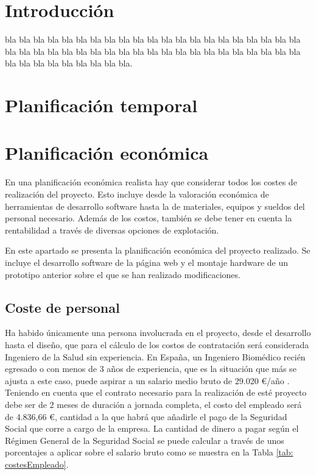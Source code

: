 
\section{Introducción}

bla bla bla bla bla bla bla bla bla bla bla bla bla bla bla bla bla bla bla bla bla bla bla bla bla bla bla bla bla bla bla bla bla bla bla bla bla bla bla bla bla bla bla bla bla bla bla bla bla bla bla.


\section{Planificación temporal}


\section{Planificación económica}
En una planificación económica realista hay que considerar todos los costes de realización del proyecto. Esto incluye desde la valoración económica de herramientas de desarrollo software hasta la de materiales, equipos y sueldos del personal necesario.
Además de los costos, también se debe tener en cuenta la rentabilidad a través de diversas opciones de explotación.

En este apartado se presenta la planificación económica del proyecto realizado. Se incluye el desarrollo software de la página web y el montaje hardware de un prototipo anterior sobre el que se han realizado modificaciones.

\subsection{Coste de personal}
Ha habido únicamente una persona involucrada en el proyecto, desde el desarrollo hasta el diseño, que para el cálculo de los costos de contratación será considerada Ingeniero de la Salud sin experiencia. 
En España, un Ingeniero Biomédico recién egresado o con menos de 3 años de experiencia, que es la situación que más se ajusta a este caso, puede aspirar a un salario medio bruto de 29.020 €/año \cite{jobtedIngenieroBiomedico}. Teniendo en cuenta que el contrato necesario para la realización de esté proyecto debe ser de 2 meses de duración a jornada completa, el costo del empleado será de 4.836,66 €, cantidad a la que habrá que añadirle el pago de la Seguridad Social que corre a cargo de la empresa. La cantidad de dinero a pagar según el Régimen General de la Seguridad Social \cite{SeguridaSocial:online} se puede calcular a través de unos porcentajes a aplicar sobre el salario bruto como se muestra en la Tabla \ref{tab: costesEmpleado}.

